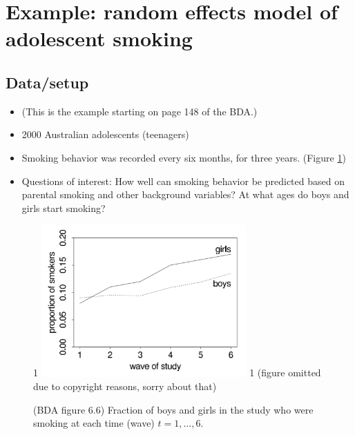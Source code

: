 \documentclass[12pt]{article}
\newcommand{\blind}{1}
\begin{document}
\section{Example: random effects model of adolescent smoking}

\subsection*{Data/setup}
\begin{itemize}
\item (This is the example starting on page 148 of the BDA.)
\item 2000 Australian adolescents (teenagers)
\item Smoking behavior was recorded every six months, for three years. (Figure \ref{figure:smoking})
\item Questions of interest: How well can smoking behavior be predicted based on parental smoking and other background variables? At what ages do boys and girls start smoking?
\end{itemize}

\begin{figure}
\begin{center}
\blind {
\includegraphics[width=0.7\textwidth]{smoking.png}
} \fi
{}\blind { (figure omitted due to copyright reasons, sorry about that) } \fi
\end{center}
\caption{(BDA figure 6.6) Fraction of boys and girls in the study who were smoking at each time (wave) $t = 1,\ldots,6$.}
\label{figure:smoking}
\end{figure}
\end{document}
